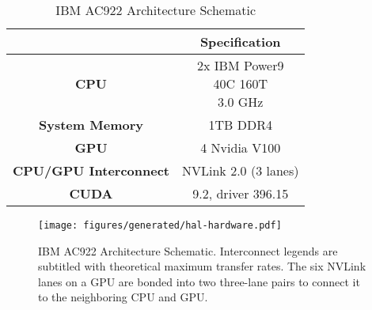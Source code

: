 \begin{table}[ht]
    \centering
    \caption[IBM AC922 Architecture Summary]{IBM AC922 Architecture Schematic}
    \label{tab:ac922}
    \begin{tabular}{cc}
    \hline
    \textbf{}                      & \textbf{Specification}                           \\ \hline
    \textbf{CPU}                   & \makecell{2x IBM Power9 \\ 40C 160T \\ 3.0 GHz } \\ \hline
    \textbf{System Memory}         & 1TB DDR4                                         \\ \hline
	\textbf{GPU}                   & 4 Nvidia V100                                    \\ \hline
	\textbf{CPU/GPU Interconnect}  & NVLink 2.0 (3 lanes)                             \\ \hline
	\textbf{CUDA}                  & 9.2, driver 396.15                               \\ \hline
    \end{tabular}
\end{table}

\begin{figure}
    \centering
	\texttt{[image: figures/generated/hal-hardware.pdf]}
    \caption[IBM AC922 Architecture Schematic]{
		IBM AC922 Architecture Schematic.
		Interconnect legends are subtitled with theoretical maximum transfer rates.
		The six NVLink lanes on a GPU are bonded into two three-lane pairs to connect it to the neighboring CPU and GPU.
	}
    \label{fig:topo-ac922-simple}
\end{figure}
